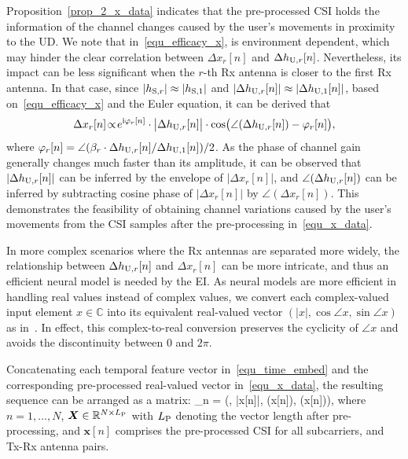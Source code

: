 


Proposition~\ref{prop_2_x_data} indicates that the pre-processed CSI holds the information of the channel changes caused by the user's movements in proximity to the UD.
We note that in~\eqref{equ_efficacy_x},  is environment dependent, which may hinder the clear correlation between $\Delta x_r[n]$ and $\Delta h_{\mathrm{U},r}[n]$.
Nevertheless, its impact can be less significant when the $r$-th Rx antenna is closer to the first Rx antenna.
In that case, since $|h_{\mathrm{S},r}|\approx |h_{\mathrm{S},1}|$ and $|\Delta h_{\mathrm{U},r}[n]|\approx |\Delta h_{\mathrm{U},1}[n]|$, based on~\eqref{equ_efficacy_x} and the Euler equation, it can be derived that 
\begin{align*}
    \Delta x_r[n] \! \propto\! e^{\mathrm{i} \varphi_r[n]} \cdot \big|\Delta h_{\mathrm{U},r}[n]\big|\cdot\cos\!\big(\angle(\Delta h_{\mathrm{U},r}[n])-\varphi_r[n]\big),
\end{align*}
where $\varphi_r[n] = \angle(\beta_r\cdot \Delta h_{\mathrm{U}, r}[n] / \Delta h_{\mathrm{U}, 1}[n])/2$.
As the phase of channel gain generally changes much faster than its amplitude, it can be observed that $|\Delta h_{\mathrm{U},r}[n]|$ can be inferred by the envelope of $|\Delta x_r[n]|$, and $\angle(\Delta h_{\mathrm{U},r}[n])$ can be inferred by subtracting cosine phase of $|\Delta x_r[n]|$ by $\angle(\Delta x_r[n])$.
This demonstrates the feasibility of obtaining channel variations caused by the user's movements from the CSI samples after the pre-processing in~\eqref{equ_x_data}. 


In more complex scenarios where the Rx antennas are separated more widely, the relationship between $\Delta h_{\mathrm{U},r}[n]$ and $\Delta x_{r}[n]$ can be more intricate, and thus an efficient neural model is needed by the EI.
As neural models are more efficient in handling real values instead of complex values, we convert each complex-valued input element $x\in\mathbb C$ into its equivalent real-valued vector $(|x|, \cos\angle x, \sin\angle x)$ as in~\cite{Hu24JSAC_Cross}.
In effect, this complex-to-real conversion preserves the cyclicity of $\angle x$ and avoids the discontinuity between $0$ and $2\pi$.

Concatenating each temporal feature vector in~\eqref{equ_time_embed} and the corresponding pre-processed real-valued vector in~\eqref{equ_x_data}, the resulting sequence can be arranged as a matrix:
\beq
[\bm X]_n = \big(\bm\tau[n], |\bm x[n]|, \cos(\angle\bm x[n]), \sin(\angle\bm x[n])\big),
\eeq
where $n=1,\dots,N$, $\bm X\in\mathbb R^{N\times L_{\mathrm{P}}}$ with $L_{\mathrm{P}}$ denoting the vector length after pre-processing, and $\bm x[n]$ comprises the pre-processed CSI for all subcarriers, and Tx-Rx antenna pairs.


